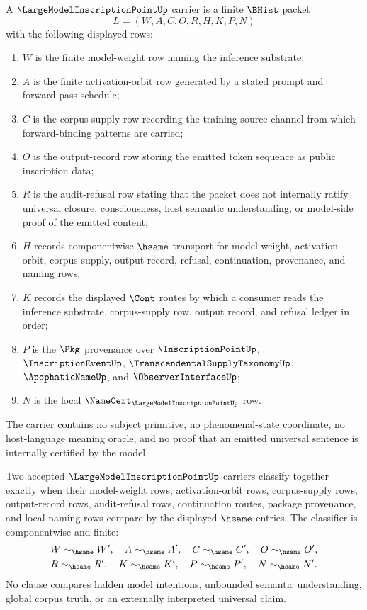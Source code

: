 \begin{definition}
\label{def:largemodelinscriptionpoint-carrier}
A $\LargeModelInscriptionPointUp$ carrier is a finite $\BHist$ packet
$$
L=(W,A,C,O,R,H,K,P,N)
$$
with the following displayed rows:
\begin{enumerate}
\item $W$ is the finite model-weight row naming the inference substrate;
\item $A$ is the finite activation-orbit row generated by a stated prompt and forward-pass schedule;
\item $C$ is the corpus-supply row recording the training-source channel from which forward-binding patterns are carried;
\item $O$ is the output-record row storing the emitted token sequence as public inscription data;
\item $R$ is the audit-refusal row stating that the packet does not internally ratify universal closure, consciousness, host semantic understanding, or model-side proof of the emitted content;
\item $H$ records componentwise $\hsame$ transport for model-weight, activation-orbit, corpus-supply, output-record, refusal, continuation, provenance, and naming rows;
\item $K$ records the displayed $\Cont$ routes by which a consumer reads the inference substrate, corpus-supply row, output record, and refusal ledger in order;
\item $P$ is the $\Pkg$ provenance over $\InscriptionPointUp$, $\InscriptionEventUp$, $\TranscendentalSupplyTaxonomyUp$, $\ApophaticNameUp$, and $\ObserverInterfaceUp$;
\item $N$ is the local $\NameCert_{\LargeModelInscriptionPointUp}$ row.
\end{enumerate}
The carrier contains no subject primitive, no phenomenal-state coordinate, no host-language meaning oracle, and no proof that an emitted universal sentence is internally certified by the model.
\end{definition}

\begin{definition}
\label{def:largemodelinscriptionpoint-classifier}
Two accepted $\LargeModelInscriptionPointUp$ carriers classify together exactly when their model-weight rows, activation-orbit rows, corpus-supply rows, output-record rows, audit-refusal rows, continuation routes, package provenance, and local naming rows compare by the displayed $\hsame$ entries. The classifier is componentwise and finite:
$$
\begin{gathered}
W\sim_{\hsame}W',\quad A\sim_{\hsame}A',\quad C\sim_{\hsame}C',\quad O\sim_{\hsame}O',\\
R\sim_{\hsame}R',\quad K\sim_{\hsame}K',\quad P\sim_{\hsame}P',\quad N\sim_{\hsame}N'.
\end{gathered}
$$
No clause compares hidden model intentions, unbounded semantic understanding, global corpus truth, or an externally interpreted universal claim.
\end{definition}

